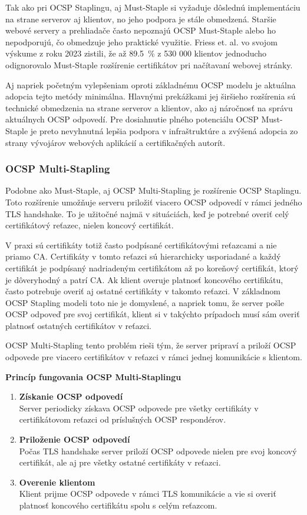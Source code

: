 \documentclass[12pt, twoside]{book}
\newcommand{\subsubsubsection}[1]{%
  \vspace{0.2em}  
  \textbf{#1} \\[0.2em]
  \hspace*{\parindent}
}
\begin{document}
Tak ako pri OCSP Staplingu, aj Must-Staple si vyžaduje dôslednú implementáciu na strane serverov aj klientov, no jeho podpora je stále obmedzená. Staršie webové servery a prehliadače často nepoznajú OCSP Must-Staple alebo ho nepodporujú, čo obmedzuje jeho praktické využitie. Friess et. al. vo svojom výskume z roku 2023 zistili, že až 89.5~\% z 530 000 klientov jednoducho odignorovalo Must-Staple rozšírenie certifikátov pri načítavaní webovej stránky.\cite{security_pki}

Aj napriek početným vylepšeniam oproti základnému OCSP modelu je aktuálna adopcia tejto metódy minimálna. Hlavnými prekážkami jej širšieho rozšírenia sú technické obmedzenia na strane serverov a klientov, ako aj náročnosť na správu aktuálnych OCSP odpovedí. Pre dosiahnutie plného potenciálu OCSP Must-Staple je preto nevyhnutná lepšia podpora v infraštruktúre a zvýšená adopcia zo strany vývojárov webových aplikácií a certifikačných autorít.


\subsubsection{OCSP Multi-Stapling}
Podobne ako Must-Staple, aj OCSP Multi-Stapling je rozšírenie OCSP Staplingu. Toto rozšírenie umožňuje serveru priložiť viacero OCSP odpovedí v rámci jedného TLS handshake. To je užitočné najmä v situáciách, keď je potrebné overiť celý certifikátový reťazec, nielen koncový certifikát.

V praxi sú certifikáty totiž často podpísané certifikátovými reťazcami a nie priamo CA. Certifikáty v tomto reťazci sú hierarchicky usporiadané a každý certifikát je podpísaný nadriadeným certifikátom až po koreňový certifikát, ktorý je dôveryhodný a patrí CA. Ak klient overuje platnosť koncového certifikátu, často potrebuje overiť aj ostatné certifikáty v takomto reťazci. V základnom OCSP Stapling modeli toto nie je domyslené, a napriek tomu, že server pošle OCSP odpoveď pre svoj certifikát, klient si v takýchto prípadoch musí sám overiť platnosť ostatných certifikátov v reťazci.

OCSP Multi-Stapling tento problém rieši tým, že server pripraví a priloží OCSP odpovede pre viacero certifikátov v reťazci v rámci jednej komunikácie s klientom.


\subsubsubsection{Princíp fungovania OCSP Multi-Staplingu}
\begin{enumerate}
\item \textbf{Získanie OCSP odpovedí} \\
Server periodicky získava OCSP odpovede pre všetky certifikáty v certifikátovom reťazci od príslušných OCSP respondérov.

\item\textbf{ Priloženie OCSP odpovedí}\\
Počas TLS handshake server priloží OCSP odpovede nielen pre svoj koncový certifikát, ale aj pre všetky ostatné certifikáty v reťazci.

\item \textbf{Overenie klientom}\\
Klient prijme OCSP odpovede v rámci TLS komunikácie a vie si overiť platnosť koncového certifikátu spolu s celým reťazcom.
\end{enumerate}
\end{document}
